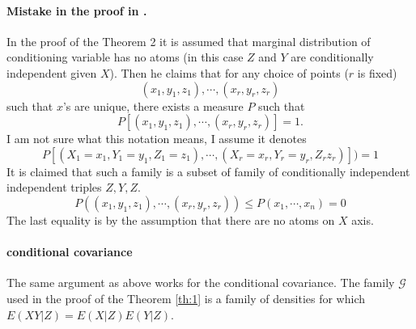 \documentclass{article}
\begin{document}
\paragraph{Mistake in the proof in \cite{bergsma2004testing}.}
In the proof of the Theorem 2 it is assumed that marginal distribution of conditioning variable has no atoms (in this case $Z$ and $Y$ are  conditionally independent given $X$). Then he claims that for any choice of points ($r$ is fixed)
\[ (x_1 , y_1 , z_1 ), \cdots, (x_r , y_r , z_r ) \]  
such that $x$'s are unique, there exists a measure $P$ such that
\[
P[(x_1 , y_1 , z_1 ), \cdots , (x_r , y_r , z_r ) ] =1. 
\]
I am not sure what this notation  means, I assume it denotes 
\[
P[(X_1=x_1 ,Y_1= y_1 , Z_1=z_1 ), \cdots , (X_r = x_r , Y_r= y_r ,Z_r z_r ) ] ) =1
\]
It is claimed that such a family is a subset of family of conditionally independent independent triples $Z,Y,Z$.
\[
P( (x_1 , y_1 , z_1 ), \cdots , (x_r , y_r , z_r ) ) \leq  P(x_1,\cdots,x_n) =0
\]
The last equality is by the assumption that there are no atoms on $X$ axis.


\paragraph{conditional covariance}
The same argument as above works for the conditional covariance. The family $\mathcal G$ used in the proof of the Theorem \ref{th:1} is a family of densities for which $E(XY|Z)=E(X|Z)E(Y|Z)$. 
\end{document}
